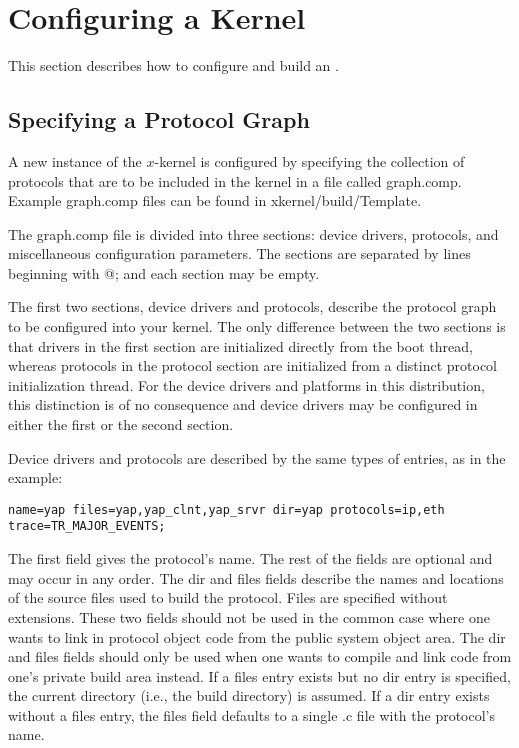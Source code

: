 % 
%
%
%
%
%
%

\section{Configuring a Kernel}
\label{config}

This section describes how to configure and build an \xk{}.

\subsection{Specifying a Protocol Graph}
\label{compose}

A new instance of the $x$-kernel is configured by specifying the
collection of protocols that are to be included in the kernel in a
file called {\sanss graph.comp}. Example {\sanss graph.comp} files can
be found in {\sanss xkernel/build/Template}.

The {\sanss graph.comp} file is divided into three sections: device
drivers, protocols, and miscellaneous configuration parameters.  The
sections are separated by lines beginning with {\sanss @;} and each
section may be empty.

The first two sections, device drivers and protocols, describe the
protocol graph to be configured into your kernel.  The only difference
between the two sections is that drivers in the first section are
initialized directly from the \xk{} boot thread, whereas protocols
in the protocol section are initialized from a distinct protocol
initialization thread.  For the device drivers and platforms in this
distribution, this distinction is of no consequence and device drivers
may be configured in either the first or the second section.

Device drivers and
protocols are described by the same types of entries, as in the
example:

\let\tt=\COURIERtt
\begin{verbatim}
name=yap files=yap,yap_clnt,yap_srvr dir=yap protocols=ip,eth trace=TR_MAJOR_EVENTS;
\end{verbatim}
\let\tt=\CMRtt

\noindent
The first field gives the protocol's name.  The rest of the fields are
optional and may occur in any order.  The {\sanss dir} and {\sanss
files} fields describe the names and locations of the source files
used to build the protocol.  Files are specified without extensions.
These two fields should not be used in the common case where one wants
to link in protocol object code from the public system object area.
The {\sanss dir} and {\sanss files} fields should only be used when
one wants to compile and link code from one's private build
area instead.  If a {\sanss files} entry exists but no {\sanss dir}
entry is specified, the current directory (i.e., the build directory)
is assumed.  If a {\sanss dir} entry exists without a {\sanss files}
entry, the {\sanss files} field defaults to a single {\sanss .c} file
with the protocol's name.

